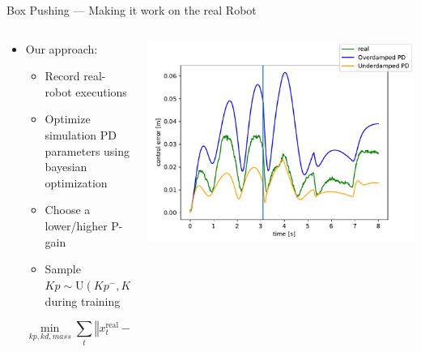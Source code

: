 \documentclass[16:9,en,navbarinfooter]{sdqbeamer}
\begin{document}
\begin{frame}{Box Pushing --- Making it work on the real Robot}
\begin{columns}
    \begin{column}{0.5\textwidth}
        \begin{itemize}
                \item Our approach:
                    \begin{itemize}
                            \item Record real-robot executions
                            \item Optimize simulation PD parameters using bayesian optimization
                            \item Choose a lower/higher P-gain 
                            \item Sample $Kp \sim \text{U}(Kp^-, Kp^+)$ during training
                    \end{itemize}

                    \[
                        \min_{kp, kd, mass} \sum_t \left\Vert x_t^\text{real} - x_t^\text{sim}(kp, kd, mass) \right\Vert
                    \]
        \end{itemize}
    \end{column}

    \begin{column}{0.5\textwidth}
\includegraphics[width=\linewidth]{media/ctrl_error.pdf}\\
    \end{column}
\end{columns}

\end{frame}
\end{document}
